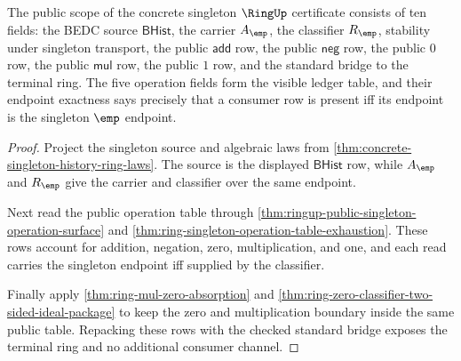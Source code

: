 \begin{theorem}
\label{thm:ring-singleton-public-certificate-scope}
The public scope of the concrete singleton $\RingUp$ certificate consists of
ten fields: the BEDC source $\mathsf{BHist}$, the carrier $A_{\emp}$, the
classifier $R_{\emp}$, stability under singleton transport, the public
$\mathsf{add}$ row, the public $\mathsf{neg}$ row, the public $0$ row, the
public $\mathsf{mul}$ row, the public $1$ row, and the standard bridge to the
terminal ring. The five operation fields form the visible ledger table, and
their endpoint exactness says precisely that a consumer row is present iff its
endpoint is the singleton $\emp$ endpoint.
\end{theorem}
\begin{proof}
Project the singleton source and algebraic laws from
\autoref{thm:concrete-singleton-history-ring-laws}. The source is the displayed
$\mathsf{BHist}$ row, while $A_{\emp}$ and $R_{\emp}$ give the carrier and
classifier over the same endpoint.

Next read the public operation table through
\autoref{thm:ringup-public-singleton-operation-surface} and
\autoref{thm:ring-singleton-operation-table-exhaustion}. These rows account for
addition, negation, zero, multiplication, and one, and each read carries the
singleton endpoint iff supplied by the classifier.

Finally apply \autoref{thm:ring-mul-zero-absorption} and
\autoref{thm:ring-zero-classifier-two-sided-ideal-package} to keep the zero and
multiplication boundary inside the same public table. Repacking these rows with
the checked standard bridge exposes the terminal ring and no additional
consumer channel.
\end{proof}

